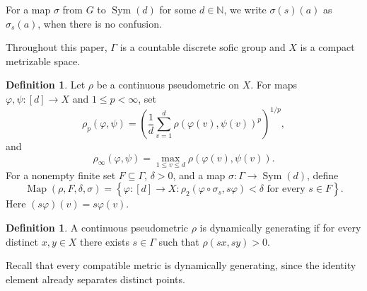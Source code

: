\documentclass[12pt]{amsart}
\theoremstyle{definition}
\newtheorem{definition}[theorem]{Definition}
\theoremstyle{remark}
\newcommand{\Map}{\operatorname{Map}}
\newcommand{\Sym}{\operatorname{Sym}}
\newcommand{\N}{\mathbb N}
\begin{document}
For a map $\sigma$ from $G$ to $\Sym(d)$ for some $d \in \N$, we write $\sigma(s)(a)$ as $\sigma_{s}(a)$, when there is no confusion.

Throughout this paper, $\Gamma$ is a countable discrete sofic group and $X$ is a compact metrizable space.
\begin{definition}
Let $\rho$ be a continuous pseudometric on $X$. For maps $\varphi,\psi:[d]\to X$ and $1\leq p<\infty$, set
\[
 \rho_p(\varphi,\psi)
 =\left(\frac1d\sum_{v=1}^d \rho(\varphi(v),\psi(v))^p\right)^{1/p},
\]
and
\[
 \rho_\infty(\varphi,\psi)=\max_{1\leq v\leq d}\rho(\varphi(v),\psi(v)).
\]
For a nonempty finite set $F\subseteq\Gamma$, $\delta>0$, and a map $\sigma:\Gamma\to\Sym(d)$, define
\[
 \Map(\rho,F,\delta,\sigma)
 =\left\{\varphi:[d]\to X:
 \rho_2(\varphi\circ\sigma_s,s\varphi)<\delta
 \text{ for every }s\in F\right\}.
\]
Here $(s\varphi)(v)=s\varphi(v)$.
\end{definition}

\begin{definition}
A continuous pseudometric $\rho$ is dynamically generating if for every distinct $x,y\in X$ there exists $s\in\Gamma$ such that $\rho(sx,sy)>0$.
\end{definition}
 Recall that every compatible metric is dynamically generating, since the identity element already separates distinct points.
\end{document}
